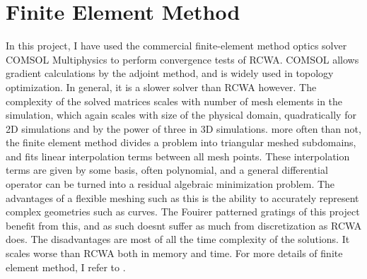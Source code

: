 \section{Finite Element Method}
In this project, I have used the commercial finite-element method optics solver COMSOL Multiphysics to perform convergence tests of RCWA. COMSOL allows gradient calculations by the adjoint method, and is widely used in topology optimization.
In general, it is a slower solver than RCWA however. The complexity of the solved matrices scales with number of mesh elements in the simulation, which again scales with size of the physical domain, quadratically for 2D simulations and by the power of three in 3D simulations.
more often than not, the finite element method divides a problem into triangular meshed subdomains, and fits linear interpolation terms between all mesh points. These interpolation terms are given by some basis, often polynomial, and a general differential operator can be turned into
a residual algebraic minimization problem. The advantages of a flexible meshing such as this is the ability to accurately represent complex geometries such as curves. The Fouirer patterned gratings of this project benefit from this, and as such doesnt suffer as much from discretization as RCWA does.  
The disadvantages are most of all the time complexity of the solutions. It scales worse than RCWA both in memory and time. For more details of finite element method, I refer to \cite{numerical_photonics}.

